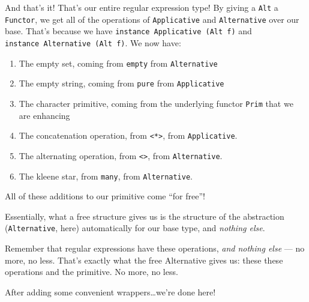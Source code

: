 \documentclass[]{article}
\begin{document}
And that's it! That's our entire regular expression type! By giving a
\texttt{Alt} a \texttt{Functor}, we get all of the operations of
\texttt{Applicative} and \texttt{Alternative} over our base. That's because we
have \texttt{instance\ Applicative\ (Alt\ f)} and
\texttt{instance\ Alternative\ (Alt\ f)}. We now have:

\begin{enumerate}
\def\labelenumi{\arabic{enumi}.}
\tightlist
\item
  The empty set, coming from \texttt{empty} from \texttt{Alternative}
\item
  The empty string, coming from \texttt{pure} from \texttt{Applicative}
\item
  The character primitive, coming from the underlying functor \texttt{Prim} that
  we are enhancing
\item
  The concatenation operation, from \texttt{\textless{}*\textgreater{}}, from
  \texttt{Applicative}.
\item
  The alternating operation, from \texttt{\textless{}\textbar{}\textgreater{}},
  from \texttt{Alternative}.
\item
  The kleene star, from \texttt{many}, from \texttt{Alternative}.
\end{enumerate}

All of these additions to our primitive come ``for free''!

Essentially, what a free structure gives us is the structure of the abstraction
(\texttt{Alternative}, here) automatically for our base type, and \emph{nothing
else}.

Remember that regular expressions have these operations, \emph{and nothing else}
--- no more, no less. That's exactly what the free Alternative gives us: these
these operations and the primitive. No more, no less.

After adding some convenient wrappers\ldots{}we're done here!
\end{document}
